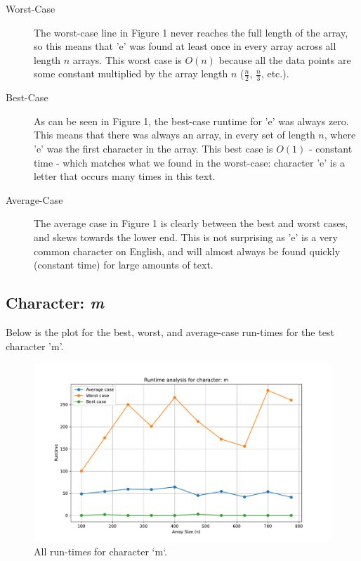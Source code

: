 \documentclass{article}
\begin{document}
\begin{description}
    \item[Worst-Case] The worst-case line in Figure 1 never reaches the full length of the array, so this means that 'e' was found at least once in every array across all length $n$ arrays. This worst case is $O(n)$ because all the data points are some constant multiplied by the array length $n$ ($\frac{n}{2}$, $\frac{n}{3}$, etc.).
    \item[Best-Case] As can be seen in Figure 1, the best-case runtime for 'e' was always zero. This means that there was always an array, in every set of length $n$, where 'e' was the first character in the array. This best case is $O(1)$ - constant time - which matches what we found in the worst-case: character 'e' is a letter that occurs many times in this text. 
    \item[Average-Case] The average case in Figure 1 is clearly between the best and worst cases, and skews towards the lower end. This is not surprising as 'e' is a very common character on English, and will almost always be found quickly (constant time) for large amounts of text. 
\end{description}

\subsection{Character: \textit{m}}
Below is the plot for the best, worst, and average-case run-times for the test character 'm'.
	
	\begin{figure}[H]
		\centering
		\includegraphics[width=\textwidth]{runtime_analysis_m.pdf}
		\caption{All run-times for character `m`.}
	\end{figure}
\end{document}
